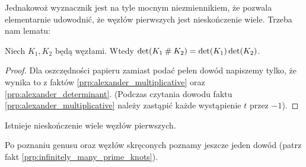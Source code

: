 Jednakowoż wyznacznik jest na tyle mocnym niezmiennikiem, że pozwala elementarnie udowodnić, że węzłów pierwszych jest nieskończenie wiele.
Trzeba nam lematu:

\begin{lemma}
\label{lem:det_multiplicativ}%
    Niech $K_1, K_2$ będą węzłami.
    Wtedy $\det(K_1 \mathbin{\#} K_2) = \det(K_1) \det(K_2)$.
\end{lemma}

\begin{proof}
    Dla oszczędności papieru zamiast podać pełen dowód napiszemy tylko, że wynika to z faktów \ref{prp:alexander_multiplicative} oraz \ref{prp:alexander_determinant}.
    (Podczas czytania dowodu faktu \ref{prp:alexander_multiplicative} należy zastąpić każde wystąpienie $t$ przez $-1$).
\end{proof}

\begin{proposition}
\label{prop:infinite_prime_knots_1}%
    Istnieje nieskończenie wiele węzłów pierwszych.
\end{proposition}

Po poznaniu genusu oraz węzłów skręconych poznamy jeszcze jeden dowód (patrz fakt \ref{prp:infinitely_many_prime_knots}).

